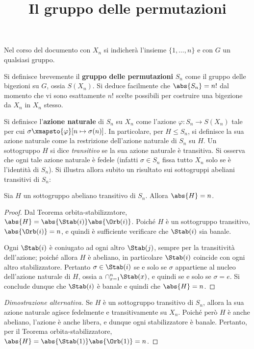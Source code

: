 \documentclass[12pt]{scrartcl}
\begin{document}
	\title{Il gruppo delle permutazioni}
	\maketitle
	
	\begin{note}
		Nel corso del documento con $X_n$ si indicherà l'insieme
		$\{1, \ldots, n\}$ e con $G$ un qualsiasi gruppo.
	\end{note}

	Si definisce brevemente il \textbf{gruppo delle permutazioni} $S_n$ come il gruppo
	delle bigezioni su $G$, ossia $S(X_n)$. Si deduce facilmente che
	$\abs{S_n} = n!$ dal momento che vi sono esattamente $n!$ scelte possibili
	per costruire una bigezione da $X_n$ in $X_n$ stesso. \medskip
	
	
	Si definisce
	l'\textbf{azione naturale} di $S_n$ su $X_n$ come l'azione $\varphi : S_n \to S(X_n)$
	tale per cui $\sigma \xmapsto{\varphi} [n \mapsto \sigma(n)]$. In particolare,
	per $H \leq S_n$, si definisce la sua azione naturale come la restrizione dell'azione
	naturale di $S_n$ su $H$. Un sottogruppo $H$ si dice \textit{transitivo} se la
	sua azione naturale è transitiva. Si osserva che ogni tale azione naturale è fedele
	(infatti $\sigma \in S_n$ fissa tutto $X_n$ solo se è l'identità di $S_n$). Si illustra allora subito un risultato sui
	sottogruppi abeliani transitivi di $S_n$:
	
	\begin{proposition}
		Sia $H$ un sottogruppo abeliano transitivo di $S_n$. Allora
		$\abs{H} = n$.
	\end{proposition}
	
	\begin{proof}
		Dal Teorema orbita-stabilizzatore, $\abs{H} = \abs{\Stab(i)} \abs{\Orb(i)}$. Poiché
		$H$ è un sottogruppo transitivo, $\abs{\Orb(i)} = n$, e quindi è sufficiente
		verificare che $\Stab(i)$ sia banale. \medskip
		
		
		Ogni $\Stab(i)$ è coniugato
		ad ogni altro $\Stab(j)$, sempre per la transitività dell'azione; poiché allora $H$ è abeliano, in particolare $\Stab(i)$ coincide con
		ogni altro stabilizzatore. Pertanto $\sigma \in \Stab(i)$ se e solo se
		$\sigma$ appartiene al nucleo dell'azione naturale di $H$, ossia
		a $\cap_{x=1}^n \Stab(x)$, e quindi se e solo se $\sigma = e$. Si conclude dunque
		che $\Stab(i)$ è banale e quindi che $\abs{H} = n$.
	\end{proof}

	\begin{proof}[Dimostrazione alternativa]
		Se $H$ è un sottogruppo transitivo di $S_n$,
		allora la sua azione naturale agisce fedelmente e
		transitivamente su $X_n$. Poiché però $H$ è anche
		abeliano, l'azione è anche libera, e dunque ogni
		stabilizzatore è banale. Pertanto, per il
		Teorema orbita-stabilizzatore, $\abs{H} =
		\abs{\Stab(1)} \abs{\Orb(1)} = n$.
	\end{proof}
	
\end{document}
